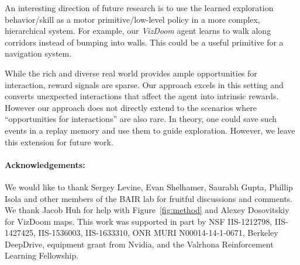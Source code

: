 \documentclass{article}
\begin{document}
An interesting direction of future research is to use the learned exploration behavior/skill as a motor primitive/low-level policy in a more complex, hierarchical system. For example, our {\em VizDoom} agent learns to walk along corridors instead of bumping into walls. This could be a useful primitive for a navigation system.

While the rich and diverse real world provides ample opportunities for interaction, reward signals are sparse. Our approach excels in this setting and converts unexpected interactions that affect the agent into intrinsic rewards. However our approach does not directly extend to the scenarios where ``opportunities for interactions'' are also rare. In theory, one could save such events in a replay memory and use them to guide exploration. However, we leave this extension for future work.

\paragraph{Acknowledgements:}
We would like to thank Sergey Levine, Evan Shelhamer, Saurabh Gupta, Phillip Isola and other members of the BAIR lab for fruitful discussions and comments. We thank Jacob Huh for help with Figure~\ref{fig:method} and Alexey Dosovitskiy for VizDoom maps. This work was supported in part by NSF IIS-1212798, IIS-1427425, IIS-1536003, IIS-1633310, ONR MURI N00014-14-1-0671, Berkeley DeepDrive, equipment grant from Nvidia, and the Valrhona Reinforcement Learning Fellowship.



\end{document}
